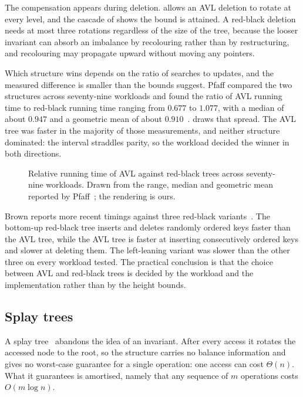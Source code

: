The compensation appears during deletion.  allows an AVL
deletion to rotate at every level, and the cascade of  shows
the bound is attained. A red-black deletion needs at most three rotations
regardless of the size of the tree, because the looser invariant can absorb an
imbalance by recolouring rather than by restructuring, and recolouring may
propagate upward without moving any pointers.

Which structure wins depends on the ratio of searches to updates, and the
measured difference is smaller than the bounds suggest. Pfaff compared the two
structures across seventy-nine workloads and found the ratio of AVL running time
to red-black running time ranging from $0.677$ to $1.077$, with a median of about
$0.947$ and a geometric mean of about $0.910$~\cite{pfaff2004}.
 draws that spread. The AVL tree was faster in the majority
of those measurements, and neither structure dominated: the interval straddles
parity, so the workload decided the winner in both directions.

\begin{figure}[t]
  \centering
  
  \caption{Relative running time of AVL against red-black trees across
  seventy-nine workloads. Drawn from the range, median and geometric mean
  reported by Pfaff~\cite{pfaff2004}; the rendering is ours.}
  \label{fig:pfaffrange}
\end{figure}

Brown reports more recent timings against three red-black variants~\cite{brown2025}.
The bottom-up red-black tree inserts and deletes randomly ordered keys faster
than the AVL tree, while the AVL tree is faster at inserting consecutively
ordered keys and slower at deleting them. The left-leaning variant was slower
than the other three on every workload tested. The practical conclusion is that
the choice between AVL and red-black trees is decided by the workload and the
implementation rather than by the height bounds.

\subsection{Splay trees}

A splay tree~\cite{sleator1985} abandons the idea of an invariant. After every access it rotates the
accessed node to the root, so the structure carries no balance information and
gives no worst-case guarantee for a single operation: one access can cost
$\Theta(n)$. What it guarantees is amortised, namely that any sequence of $m$
operations costs $O(m \log n)$.

